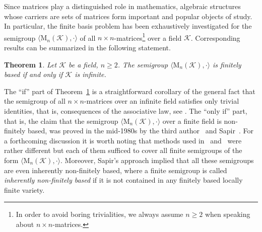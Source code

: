 \documentclass[11pt,reqno]{amsart}
\numberwithin{equation}{section}
\newtheorem{Thm}{Theorem}[section]
\theoremstyle{remark}
\begin{document}
Since matrices play a distinguished role in mathematics, algebraic
structures whose carriers are sets of matrices form important and
popular objects of study. In particular, the finite basis problem
has been exhaustively investigated for the semigroup
$\langle\mathrm{M}_n(\mathcal{K}),\cdot\rangle$ of all $n\times
n$-matrices\footnote{In order to avoid boring trivialities, we
always assume $n\ge 2$ when speaking about $n\times n$-matrices.}
over a field $\mathcal{K}$. Corresponding results can be
summarized in the following statement.
\begin{Thm}\label{Theorem 1.1}
Let $\mathcal{K}$ be a field, $n\ge2$. The semigroup
$\langle\mathrm{M}_n(\mathcal{K}),\cdot\rangle$ is finitely based
if and only if $\mathcal{K}$ is infinite.
\end{Thm}
The ``if'' part of Theorem~\ref{Theorem 1.1} is a straightforward
corollary of the general fact that the semigroup of all $n\times
n$-matrices over an infinite field satisfies only trivial
identities, that is, consequences of the associative law, see
\cite[Lemma~2]{GoMi78}. The ``only if'' part, that is, the claim
that the semigroup $\langle\mathrm{M}_n(\mathcal{K}),\cdot\rangle$
over a finite field is non-finitely based, was proved in the
mid-1980s by the third author~\cite[Proposition~3]{V} and
Sapir~\cite[Corollary 6.2]{sapirburnside}. For a forthcoming
discussion it is worth noting that methods used in~\cite{V}
and~\cite{sapirburnside} were rather different but each of them
sufficed to cover all finite semigroups of the form
$\langle\mathrm{M}_n(\mathcal{K}),\cdot\rangle$. Moreover, Sapir's
approach implied that all these semigroups are even inherently
non-finitely based, where a finite semigroup is called
\emph{inherently non-finitely based} if it is not contained in any
finitely based locally finite variety.
\end{document}
